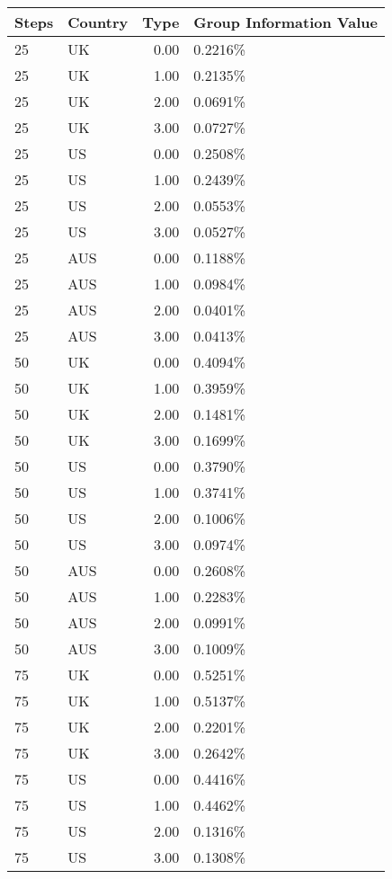 \begin{table}[ht]
\centering
\begin{tabular}{llrl}
  \hline
Steps & Country & Type & Group Information Value \\ 
  \hline
25 & UK & 0.00 & 0.2216\% \\ 
  25 & UK & 1.00 & 0.2135\% \\ 
  25 & UK & 2.00 & 0.0691\% \\ 
  25 & UK & 3.00 & 0.0727\% \\ 
  25 & US & 0.00 & 0.2508\% \\ 
  25 & US & 1.00 & 0.2439\% \\ 
  25 & US & 2.00 & 0.0553\% \\ 
  25 & US & 3.00 & 0.0527\% \\ 
  25 & AUS & 0.00 & 0.1188\% \\ 
  25 & AUS & 1.00 & 0.0984\% \\ 
  25 & AUS & 2.00 & 0.0401\% \\ 
  25 & AUS & 3.00 & 0.0413\% \\ 
  50 & UK & 0.00 & 0.4094\% \\ 
  50 & UK & 1.00 & 0.3959\% \\ 
  50 & UK & 2.00 & 0.1481\% \\ 
  50 & UK & 3.00 & 0.1699\% \\ 
  50 & US & 0.00 & 0.3790\% \\ 
  50 & US & 1.00 & 0.3741\% \\ 
  50 & US & 2.00 & 0.1006\% \\ 
  50 & US & 3.00 & 0.0974\% \\ 
  50 & AUS & 0.00 & 0.2608\% \\ 
  50 & AUS & 1.00 & 0.2283\% \\ 
  50 & AUS & 2.00 & 0.0991\% \\ 
  50 & AUS & 3.00 & 0.1009\% \\ 
  75 & UK & 0.00 & 0.5251\% \\ 
  75 & UK & 1.00 & 0.5137\% \\ 
  75 & UK & 2.00 & 0.2201\% \\ 
  75 & UK & 3.00 & 0.2642\% \\ 
  75 & US & 0.00 & 0.4416\% \\ 
  75 & US & 1.00 & 0.4462\% \\ 
  75 & US & 2.00 & 0.1316\% \\ 
  75 & US & 3.00 & 0.1308\% \\ 

\end{tabular}
\end{table}
